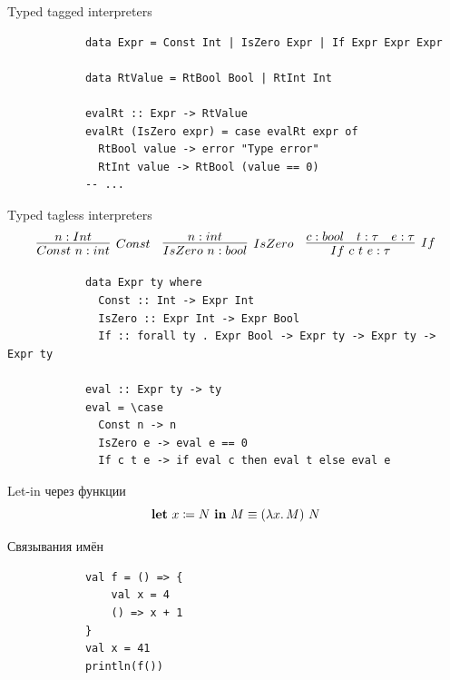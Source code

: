     \begin{frame}[fragile]{Typed tagged interpreters}
        \pause
        \begin{verbatim}
            data Expr = Const Int | IsZero Expr | If Expr Expr Expr

            data RtValue = RtBool Bool | RtInt Int

            evalRt :: Expr -> RtValue
            evalRt (IsZero expr) = case evalRt expr of
              RtBool value -> error "Type error"
              RtInt value -> RtBool (value == 0)
            -- ...
        \end{verbatim}
    \end{frame}

    \begin{frame}[fragile]{Typed tagless interpreters}
        \pause
        \begin{equation*}{}
            \infer[Const]{Const~n : int}{n : Int}
            \quad
            \infer[IsZero]{IsZero~n : bool}{n : int}
            \quad
            \infer[If]{If~c~t~e : \tau}{c : bool & t : \tau & e : \tau}
        \end{equation*}
        \pause
        \begin{verbatim}
            data Expr ty where
              Const :: Int -> Expr Int
              IsZero :: Expr Int -> Expr Bool
              If :: forall ty . Expr Bool -> Expr ty -> Expr ty -> Expr ty

            eval :: Expr ty -> ty
            eval = \case
              Const n -> n
              IsZero e -> eval e == 0
              If c t e -> if eval c then eval t else eval e
        \end{verbatim}
    \end{frame}


    \begin{frame}[fragile]{Let-in через функции}
        \pause
        \[
            \mathbf{let} ~ x \coloneqq N ~ \mathbf{in} ~ M \equiv (\lambda x\ldotp M) ~ N
        \]
    \end{frame}

    \begin{frame}[fragile]{Связывания имён}
        \pause
        \begin{verbatim}
            val f = () => {
                val x = 4
                () => x + 1
            }
            val x = 41
            println(f())
        \end{verbatim}
    \end{frame}


